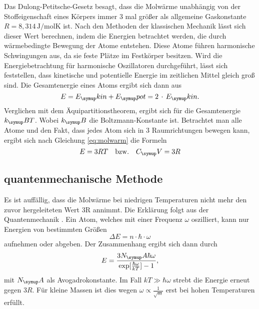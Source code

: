 Das Dulong-Petitsche-Gesetz besagt, dass die Molwärme unabhängig von der
Stoffeigenschaft eines Körpers immer 3 mal größer als allgemeine
Gaskonstante $R=8,314\,\si{\joule\per\mol\kelvin}$\cite{chemie} ist.
Nach den Methoden der klassischen Mechanik lässt sich dieser Wert berechnen,
indem die Energien betrachtet werden, die durch wärmebedingte Bewegung der Atome
entstehen. Diese Atome führen harmonische Schwingungen aus, da sie feste Plätze
im Festkörper besitzen. Wird die Energiebetrachtung für harmonische Oszillatoren
durchgeführt, lässt sich feststellen, dass kinetische und potentielle Energie
im zeitlichen Mittel gleich groß sind. Die Gesamtenergie eines Atoms ergibt sich
dann aus
\begin{equation}
  E= E_\su{kin}+E_\su{pot} = 2\,\cdot\,E_\su{kin}.
\end{equation}
Verglichen mit dem Äquipartitionstheorem, ergibt sich für die Gesamtenergie
$k_\su{B}T$. Wobei $k_\su{B}$ die Boltzmann-Konstante ist.
Betrachtet man alle Atome und den Fakt, dass jedes Atom sich in 3 Raumrichtungen
bewegen kann, ergibt sich nach Gleichung \eqref{eq:molwarm} die Formeln
\begin{equation}
  E=3RT\quad\text{bzw.}\quad C_\su{V}=3R
\end{equation}
\subsection{quantenmechanische Methode}
Es ist auffällig, dass die Molwärme bei niedrigen Temperaturen nicht mehr den
zuvor hergeleiteten Wert 3R annimmt. Die Erklärung folgt aus der Quantenmechanik
. Ein Atom, welches mit einer Frequenz $\omega$ oszilliert, kann nur Energien von
bestimmten Größen
\begin{equation}
  \Delta E = n\cdot\hbar\cdot\omega
\end{equation}
aufnehmen oder abgeben. Der Zusammenhang ergibt sich dann durch
\begin{equation}
  E=\frac{3N_\su{A}\hbar\omega}{\exp[\frac{\hbar\omega}{kT}]-1},
\end{equation}
mit $N_\su{A}$ als Avogadrokonstante. Im Fall $kT\gg\hbar\omega$ strebt die
Energie erneut gegen $3R$. Für kleine Massen ist dies wegen $\omega\propto
\frac{1}{\sqrt{m}}$ erst bei hohen Temperaturen erfüllt.
